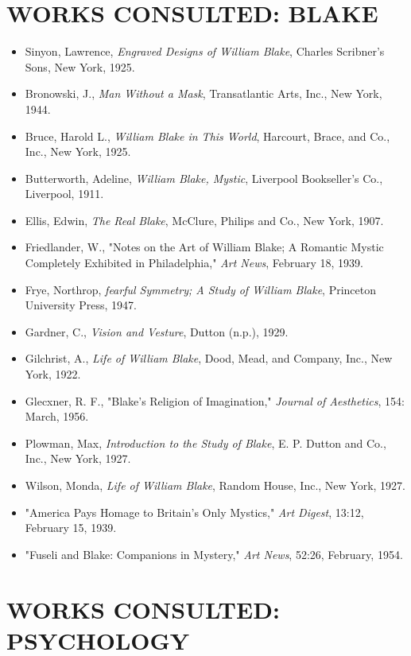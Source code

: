 \section*{\centering WORKS CONSULTED: BLAKE}

\begin{itemize}
	\item Sinyon, Lawrence, \textit{Engraved Designs of William Blake}, Charles Scribner's Sons, New York, 1925.
	\item Bronowski, J., \textit{Man Without a Mask}, Transatlantic Arts, Inc., New York, 1944.
	\item Bruce, Harold L., \textit{William Blake in This World}, Harcourt, Brace, and Co., Inc., New York, 1925.
	\item Butterworth, Adeline, \textit{William Blake, Mystic}, Liverpool Bookseller's Co., Liverpool, 1911.
	\item Ellis, Edwin, \textit{The Real Blake}, McClure, Philips and Co., New York, 1907.
	\item Friedlander, W., "Notes on the Art of William Blake; A Romantic Mystic Completely Exhibited in Philadelphia," \textit{Art News}, February 18, 1939.
	\item Frye, Northrop, \textit{fearful Symmetry; A Study of William Blake}, Princeton University Press, 1947.
	\item Gardner, C., \textit{Vision and Vesture}, Dutton (n.p.), 1929.
	\item Gilchrist, A., \textit{Life of William Blake}, Dood, Mead, and Company, Inc., New York, 1922.
	\item Glecxner, R. F., "Blake's Religion of Imagination," \textit{Journal of Aesthetics}, 154: March, 1956.
	\item Plowman, Max, \textit{Introduction to the Study of Blake}, E. P. Dutton and Co., Inc., New York, 1927.
	\item Wilson, Monda, \textit{Life of William Blake}, Random House, Inc., New York, 1927.
	\item "America Pays Homage to Britain's Only Mystics," \textit{Art Digest}, 13:12, February 15, 1939.
	\item "Fuseli and Blake: Companions in Mystery," \textit{Art News}, 52:26, February, 1954.
\end{itemize}

\section*{\centering WORKS CONSULTED: PSYCHOLOGY}

